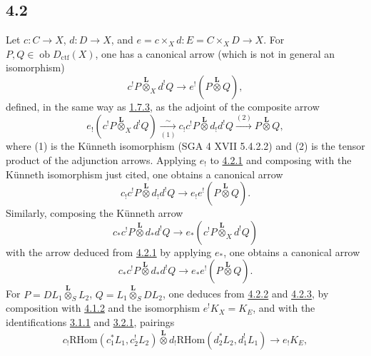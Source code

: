 \documentclass[11pt]{article}
\newcommand{\ob}{\operatorname{ob}}
\providecommand{\RHom}{\mathrm{RHom}}
\providecommand{\Dctf}{D_{\mathrm{ctf}}}
\providecommand{\Dctf}{D_{\mathrm{ctf}}}
\providecommand{\RHom}{\mathrm{RHom}}
\providecommand{\ob}{\operatorname{ob}}
\providecommand{\RHom}{\mathrm R\mathcal{H}om}
\providecommand{\RHom}{\mathrm{RHom}}
\begin{document}
\subsection*{4.2}\label{sga5:III:subsection:4.2}
Let $c:C\to X$, $d:D\to X$, and $e=c\times_Xd:E=C\times_XD\to X$. For $P,Q\in\ob\Dctf(X)$, one has a canonical arrow (which is not in general an isomorphism)
\begin{equation}
c^!P\overset{\mathbf L}{\otimes}_X d^!Q
\longrightarrow e^!(P\overset{\mathbf L}{\otimes}Q),
\tag{4.2.1}\label{sga5:III:equation:4.2.1}
\end{equation}
defined, in the same way as \hyperref[sga5:III:equation:1.7.3]{1.7.3}, as the adjoint of the composite arrow
\[
e_!(c^!P\overset{\mathbf L}{\otimes}_X d^!Q)
\xrightarrow[(1)]{\sim}
 c_!c^!P\overset{\mathbf L}{\otimes}d_!d^!Q
\xrightarrow{(2)} P\overset{\mathbf L}{\otimes}Q,
\]
where (1) is the Künneth isomorphism (SGA 4 XVII 5.4.2.2) and (2) is the tensor product of the adjunction arrows. Applying $e_!$ to \hyperref[sga5:III:equation:4.2.1]{4.2.1} and composing with the Künneth isomorphism just cited, one obtains a canonical arrow
\begin{equation}
c_!c^!P\overset{\mathbf L}{\otimes}d_!d^!Q
\longrightarrow e_!e^!(P\overset{\mathbf L}{\otimes}Q).
\tag{4.2.2}\label{sga5:III:equation:4.2.2}
\end{equation}
Similarly, composing the Künneth arrow
\[
c_*c^!P\overset{\mathbf L}{\otimes}d_*d^!Q
\longrightarrow e_*(c^!P\overset{\mathbf L}{\otimes}_X d^!Q)
\]
with the arrow deduced from \hyperref[sga5:III:equation:4.2.1]{4.2.1} by applying $e_*$, one obtains a canonical arrow
\begin{equation}
c_*c^!P\overset{\mathbf L}{\otimes}d_*d^!Q
\longrightarrow e_*e^!(P\overset{\mathbf L}{\otimes}Q).
\tag{4.2.3}\label{sga5:III:equation:4.2.3}
\end{equation}
For $P=DL_1\overset{\mathbf L}{\otimes}_S L_2$, $Q=L_1\overset{\mathbf L}{\otimes}_S DL_2$, one deduces from \hyperref[sga5:III:equation:4.2.2]{4.2.2} and \hyperref[sga5:III:equation:4.2.3]{4.2.3}, by composition with \hyperref[sga5:III:equation:4.1.2]{4.1.2} and the isomorphism $e^!K_X=K_E$, and with the identifications \hyperref[sga5:III:equation:3.1.1]{3.1.1} and \hyperref[sga5:III:equation:3.2.1]{3.2.1}, pairings
\begin{equation}
c_!\RHom(c_1^*L_1,c_2^!L_2)\overset{\mathbf L}{\otimes}
 d_!\RHom(d_2^*L_2,d_1^!L_1)
\longrightarrow e_!K_E,
\tag{4.2.4}\label{sga5:III:equation:4.2.4}
\end{equation}
\end{document}
